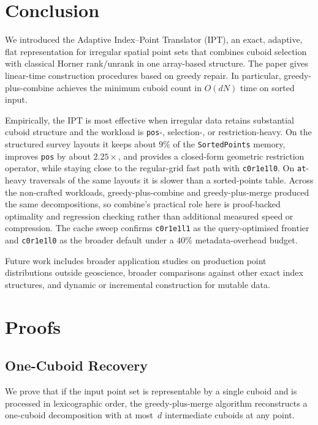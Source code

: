 \documentclass[manuscript,screen,review]{acmart}
\theoremstyle{definition}
\theoremstyle{plain}
\begin{document}
\section{Conclusion}
\label{section:conclusion}

We introduced the Adaptive Index--Point Translator (IPT), an exact,
adaptive, flat representation for irregular spatial point sets that
combines cuboid selection with classical Horner rank/unrank in one
array-based structure. The paper gives linear-time construction
procedures based on greedy repair. In particular,
greedy-plus-combine achieves the minimum cuboid count in $O(dN)$ time
on sorted input.

Empirically, the IPT is most effective when irregular data retains
substantial cuboid structure and the workload is
\texttt{pos}-, selection-, or restriction-heavy. On the structured
survey layouts it keeps about $9\%$ of the \texttt{SortedPoints}
memory, improves \texttt{pos} by about $2.25\times$, and provides a
closed-form geometric restriction operator, while staying close to the
regular-grid fast path with \texttt{c0r1e1l0}. On
\texttt{at}-heavy traversals of the same layouts it is slower than a
sorted-points table. Across the non-crafted workloads,
greedy-plus-combine and greedy-plus-merge produced the same
decompositions, so combine's practical role here is proof-backed
optimality and regression checking rather than additional measured
speed or compression. The cache sweep confirms \texttt{c0r1e1l1} as
the query-optimised frontier and \texttt{c0r1e1l0} as the broader
default under a $40\%$ metadata-overhead budget.

Future work includes broader application studies on production point
distributions outside geoscience, broader comparisons against other
exact index structures, and dynamic or incremental construction for
mutable data.

\appendix

\section{Proofs}

\subsection{One-Cuboid Recovery}
\label{proof:one-cuboid-recovery}

We prove that if the input point set is representable by a single cuboid and is processed in lexicographic order, the greedy-plus-merge algorithm reconstructs a one-cuboid decomposition with at most~$d$ intermediate cuboids at any point.
\end{document}
